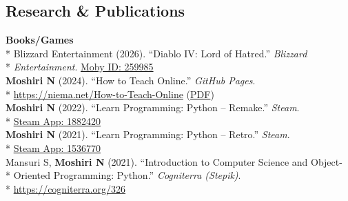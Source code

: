 \documentclass[margin,line]{res}
\begin{document}
\begin{resume}
\section{\sc Research \& Publications}
\textbf{Books/Games}\vspace{2mm}\\*
\hspace*{4mm} Blizzard Entertainment (2026). ``Diablo IV: Lord of Hatred.'' \textit{Blizzard}\\*\vspace{2mm}
\hspace*{8mm} \textit{Entertainment}. \href{https://www.mobygames.com/game/259985/diablo-iv-lord-of-hatred}{Moby ID: 259985}\\
\hspace*{4mm} \textbf{Moshiri N} (2024). ``How to Teach Online.'' \textit{GitHub Pages}.\\*\vspace{2mm}
\hspace*{8mm} \href{https://niema.net/How-to-Teach-Online}{https://niema.net/How-to-Teach-Online} (\href{https://github.com/niemasd/How-to-Teach-Online/releases/latest/download/How-to-Teach-Online.pdf}{PDF})\\
\hspace*{4mm} \textbf{Moshiri N} (2022). ``Learn Programming: Python -- Remake.'' \textit{Steam}.\\*\vspace{2mm}
\hspace*{8mm} \href{https://store.steampowered.com/app/1882420}{Steam App: 1882420}\\
\hspace*{4mm} \textbf{Moshiri N} (2021). ``Learn Programming: Python -- Retro.'' \textit{Steam}.\\*\vspace{2mm}
\hspace*{8mm} \href{https://store.steampowered.com/app/1536770}{Steam App: 1536770}\\
\hspace*{4mm} Mansuri S, \textbf{Moshiri N} (2021). ``Introduction to Computer Science and Object-\\*
\hspace*{9.5mm} Oriented Programming: Python.'' \textit{Cogniterra (Stepik)}.\\*\vspace{2mm}
\hspace*{8mm} \href{https://cogniterra.org/326}{https://cogniterra.org/326}\\

\end{resume}
\end{document}
